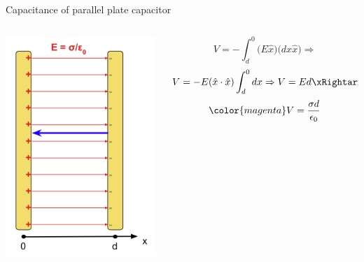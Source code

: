 \begin{frame}{Capacitance of parallel plate capacitor}
\begin{columns}
  \begin{column}{0.25\textwidth}
   \begin{center}
     \includegraphics[width=0.99\textwidth]{./images/schematics/parallel_plate_capacitor_path_integral.png}\\
   \end{center}
  \end{column}
  \begin{column}{0.75\textwidth}
    \begin{equation*}
       V = - \int_{d}^{0} \big( E \hat{x} \big) \Big( dx \hat{x} \Big) \Rightarrow
    \end{equation*}
    \begin{equation*}
      V = - E (\hat{x} \cdot \hat{x}) \int_{d}^{0} dx \Rightarrow
      V =  E d \xRightarrow{E = \frac{\sigma}{\epsilon_0}}
    \end{equation*}
    \begin{equation*}
       {\color{magenta} V =  \frac{\sigma d}{\epsilon_0} }
    \end{equation*}

  \end{column}
\end{columns}

\end{frame}

